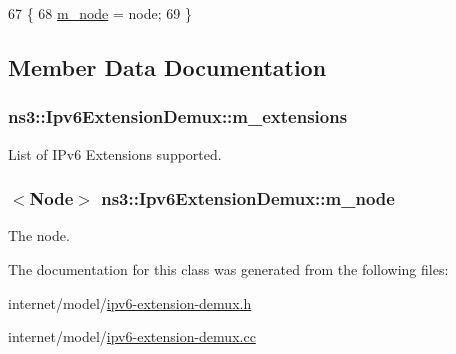 \begin{DoxyCode}
67 \{
68   \hyperlink{classns3_1_1Ipv6ExtensionDemux_ab3a2f9746c64ed928a15b640f54d316f}{m\_node} = node;
69 \}
\end{DoxyCode}


\subsection{Member Data Documentation}
\subsubsection[{\texorpdfstring{m\+\_\+extensions}{m_extensions}}]{ ns3\+::\+Ipv6\+Extension\+Demux\+::m\+\_\+extensions\hspace{0.3cm}{\ttfamily [private]}}\hypertarget{classns3_1_1Ipv6ExtensionDemux_a177a1ee4f1bed804bbd4733206fdb81b}{}\label{classns3_1_1Ipv6ExtensionDemux_a177a1ee4f1bed804bbd4733206fdb81b}


List of I\+Pv6 Extensions supported. 

\subsubsection[{\texorpdfstring{m\+\_\+node}{m_node}}]{$<${\bf Node}$>$ ns3\+::\+Ipv6\+Extension\+Demux\+::m\+\_\+node\hspace{0.3cm}{\ttfamily [private]}}\hypertarget{classns3_1_1Ipv6ExtensionDemux_ab3a2f9746c64ed928a15b640f54d316f}{}\label{classns3_1_1Ipv6ExtensionDemux_ab3a2f9746c64ed928a15b640f54d316f}


The node. 



The documentation for this class was generated from the following files\+:\begin{DoxyCompactItemize}
\item 
internet/model/\hyperlink{ipv6-extension-demux_8h}{ipv6-\/extension-\/demux.\+h}\item 
internet/model/\hyperlink{ipv6-extension-demux_8cc}{ipv6-\/extension-\/demux.\+cc}\end{DoxyCompactItemize}
